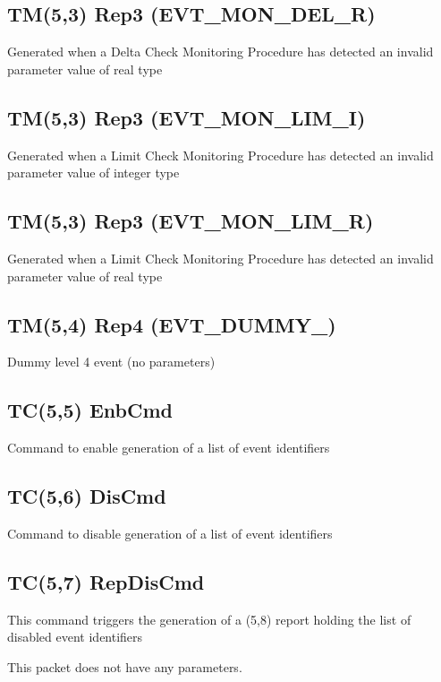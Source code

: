 \pagebreak
\subsection{TM(5,3) Rep3 (EVT\_\-MON\_\-DEL\_\-R)}
Generated when a Delta Check Monitoring Procedure has detected an invalid parameter value of real type

\pagebreak
\subsection{TM(5,3) Rep3 (EVT\_\-MON\_\-LIM\_\-I)}
Generated when a Limit Check Monitoring Procedure has detected an invalid parameter value of integer type

\pagebreak
\subsection{TM(5,3) Rep3 (EVT\_\-MON\_\-LIM\_\-R)}
Generated when a Limit Check Monitoring Procedure has detected an invalid parameter value of real type

\pagebreak
\subsection{TM(5,4) Rep4 (EVT\_\-DUMMY\_)}
Dummy level 4 event (no parameters)

\pagebreak
\subsection{TC(5,5) EnbCmd}
Command to enable generation of a list of event identifiers

\pagebreak
\subsection{TC(5,6) DisCmd}
Command to disable generation of a list of event identifiers

\pagebreak
\subsection{TC(5,7) RepDisCmd}
This command triggers the generation of a (5,8) report holding the list of disabled event identifiers

This packet does not have any parameters.

